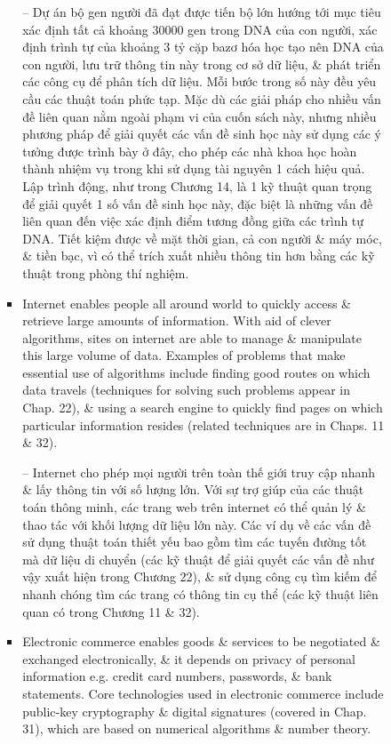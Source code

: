 \documentclass{article}
\begin{document}
\begin{itemize}
\begin{itemize}
\begin{itemize}
\begin{itemize}
                -- Dự án bộ gen người đã đạt được tiến bộ lớn hướng tới mục tiêu xác định tất cả khoảng 30000 gen trong DNA của con người, xác định trình tự của khoảng 3 tỷ cặp bazơ hóa học tạo nên DNA của con người, lưu trữ thông tin này trong cơ sở dữ liệu, \& phát triển các công cụ để phân tích dữ liệu. Mỗi bước trong số này đều yêu cầu các thuật toán phức tạp. Mặc dù các giải pháp cho nhiều vấn đề liên quan nằm ngoài phạm vi của cuốn sách này, nhưng nhiều phương pháp để giải quyết các vấn đề sinh học này sử dụng các ý tưởng được trình bày ở đây, cho phép các nhà khoa học hoàn thành nhiệm vụ trong khi sử dụng tài nguyên 1 cách hiệu quả. Lập trình động, như trong Chương 14, là 1 kỹ thuật quan trọng để giải quyết 1 số vấn đề sinh học này, đặc biệt là những vấn đề liên quan đến việc xác định điểm tương đồng giữa các trình tự DNA. Tiết kiệm được về mặt thời gian, cả con người \& máy móc, \& tiền bạc, vì có thể trích xuất nhiều thông tin hơn bằng các kỹ thuật trong phòng thí nghiệm.
                \item Internet enables people all around world to quickly access \& retrieve large amounts of information. With aid of clever algorithms, sites on internet are able to manage \& manipulate this large volume of data. Examples of problems that make essential use of algorithms include finding good routes on which data travels (techniques for solving such problems appear in Chap. 22), \& using a search engine to quickly find pages on which particular information resides (related techniques are in Chaps. 11 \& 32).
                
                -- Internet cho phép mọi người trên toàn thế giới truy cập nhanh \& lấy thông tin với số lượng lớn. Với sự trợ giúp của các thuật toán thông minh, các trang web trên internet có thể quản lý \& thao tác với khối lượng dữ liệu lớn này. Các ví dụ về các vấn đề sử dụng thuật toán thiết yếu bao gồm tìm các tuyến đường tốt mà dữ liệu di chuyển (các kỹ thuật để giải quyết các vấn đề như vậy xuất hiện trong Chương 22), \& sử dụng công cụ tìm kiếm để nhanh chóng tìm các trang có thông tin cụ thể (các kỹ thuật liên quan có trong Chương 11 \& 32).
                \item Electronic commerce enables goods \& services to be negotiated \& exchanged electronically, \& it depends on privacy of personal information e.g. credit card numbers, passwords, \& bank statements. Core technologies used in electronic commerce include public-key cryptography \& digital signatures (covered in Chap. 31), which are based on numerical algorithms \& number theory.
                

\end{itemize}
\end{itemize}
\end{itemize}
\end{itemize}
\end{document}
